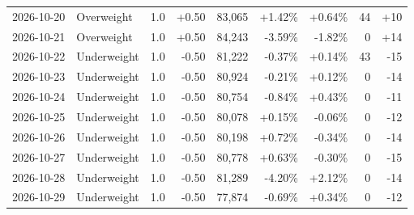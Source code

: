 \begin{longtable}{llrrrrrrr}
2026-10-20 & Overweight & 1.0 & +0.50 & 83,065 & +1.42\% & +0.64\% & 44 & +10 \\
2026-10-21 & Overweight & 1.0 & +0.50 & 84,243 & -3.59\% & -1.82\% & 0 & +14 \\
2026-10-22 & Underweight & 1.0 & -0.50 & 81,222 & -0.37\% & +0.14\% & 43 & -15 \\
2026-10-23 & Underweight & 1.0 & -0.50 & 80,924 & -0.21\% & +0.12\% & 0 & -14 \\
2026-10-24 & Underweight & 1.0 & -0.50 & 80,754 & -0.84\% & +0.43\% & 0 & -11 \\
2026-10-25 & Underweight & 1.0 & -0.50 & 80,078 & +0.15\% & -0.06\% & 0 & -12 \\
2026-10-26 & Underweight & 1.0 & -0.50 & 80,198 & +0.72\% & -0.34\% & 0 & -14 \\
2026-10-27 & Underweight & 1.0 & -0.50 & 80,778 & +0.63\% & -0.30\% & 0 & -15 \\
2026-10-28 & Underweight & 1.0 & -0.50 & 81,289 & -4.20\% & +2.12\% & 0 & -14 \\
2026-10-29 & Underweight & 1.0 & -0.50 & 77,874 & -0.69\% & +0.34\% & 0 & -12 \\
\bottomrule
\end{longtable}